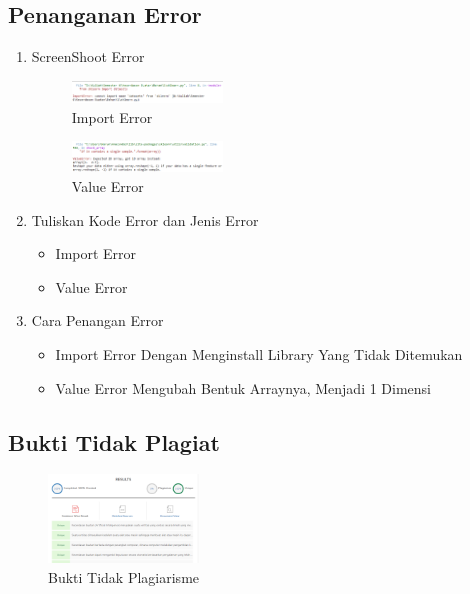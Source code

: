 \subsection{Penanganan Error}
\begin{enumerate}
	\item ScreenShoot Error
	\begin{figure}[H]
		\includegraphics[width=4cm]{figures/1174096/error/1_import.png}
		\centering
		\caption{Import Error}
	\end{figure}
	\begin{figure}[H]
		\includegraphics[width=4cm]{figures/1174096/error/1_value.png}
		\centering
		\caption{Value Error}
	\end{figure}
	\item Tuliskan Kode Error dan Jenis Error
	\begin{itemize}
		\item Import Error
		\item Value Error
	\end{itemize}
	\item Cara Penangan Error
	\begin{itemize}
		\item Import Error
		\hfill\break
		Dengan Menginstall Library Yang Tidak Ditemukan
		\item Value Error
		\hfill\break
		Mengubah Bentuk Arraynya, Menjadi 1 Dimensi
	\end{itemize}
\end{enumerate}
\subsection{Bukti Tidak Plagiat}
\begin{figure}[H]
	\includegraphics[width=4cm]{figures/1174096/bukti/plagiarisme.PNG}
	\centering
	\caption{Bukti Tidak Plagiarisme}
\end{figure}